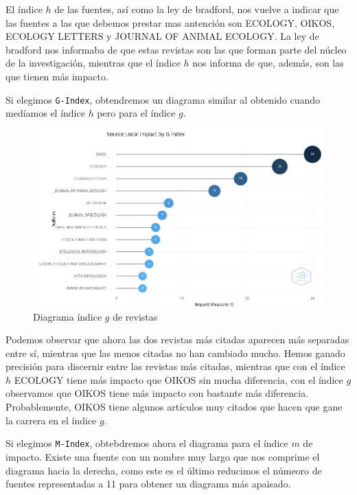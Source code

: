 \documentclass[
]{article}
\begin{document}
El índice \(h\) de las fuentes, así como la ley de bradford, nos vuelve
a indicar que las fuentes a las que debemos prestar mas antención son
ECOLOGY, OIKOS, ECOLOGY LETTERS y JOURNAL OF ANIMAL ECOLOGY. La ley de
bradford nos informaba de que estas revistas son las que forman parte
del núcleo de la investigación, mientras que el índice \(h\) nos informa
de que, además, son las que tienen más impacto.

Si elegimos \texttt{G-Index}, obtendremos un diagrama similar al
obtenido cuando medíamos el índice \(h\) pero para el índice \(g\).

\begin{figure}
\centering
\includegraphics{SourceImpactByGIndex.png}
\caption{Diagrama índice \(g\) de revistas}
\end{figure}

Podemos observar que ahora las dos revistas más citadas aparecen más
separadas entre sí, mientras que las menos citadas no han cambiado
mucho. Hemos ganado precisión para discernir entre las revistas más
citadas, mientras que con el índice \(h\) ECOLOGY tiene más impacto que
OIKOS sin mucha diferencia, con el índice \(g\) observamos que OIKOS
tiene más impacto con bastante más diferencia. Probablemente, OIKOS
tiene algunos artículos muy citados que hacen que gane la carrera en el
índice \(g\).

Si elegimos \texttt{M-Index}, obtebdremos ahora el diagrama para el
índice \(m\) de impacto. Existe una fuente con un nombre muy largo que
nos comprime el diagrama hacia la derecha, como este es el último
reducimos el númeoro de fuentes representadas a 11 para obtener un
diagrama más apaisado.
\end{document}
